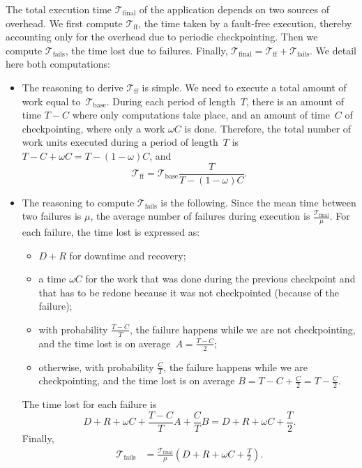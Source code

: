 \documentclass[a4paper]{article}
\newcommand{\ema}[1]{\ensuremath{#1}\xspace}
\newcommand{\ccc}{\ema{C}}
\newcommand{\rrr}{\ema{R}}
\newcommand{\ddd}{\ema{D}}
\newcommand{\period}{T}
\renewcommand{\time}[1][]{\ema{\mathcal{T}_{\text{#1}}}}
\newcommand{\tbase}{\time[base]}
\newcommand{\tff}{\time[ff]}
\newcommand{\tfails}{\time[fails]}
\newcommand{\tfin}{\time[final]}
\newcommand{\workduringckpt}{\omega}
\begin{document}
The total execution time \tfin of the application depends on two sources of overhead. We 
first compute \tff, the time taken by a fault-free execution, thereby accounting only 
for the overhead due to 
periodic checkpointing. Then we compute \tfails, the time lost due to failures. Finally,  
$\tfin=\tff+\tfails$. We detail here both computations:
\begin{itemize}
	\item The reasoning to derive \tff is simple. We need to execute a total amount of work equal to~\tbase.
	During each period of length~$\period$,
there is an amount of time $\period - \ccc$ where only computations take place, and an amount of time~$\ccc$ 
of checkpointing, where only a work $\workduringckpt \ccc$ is done. Therefore, the total number of work
units executed during a period of length~$\period$ is $\period - \ccc +\workduringckpt \ccc = \period - (1- \workduringckpt) \ccc$,
and \\[-.2cm]
\[\tff = \tbase \frac{\period}{\period - (1- \workduringckpt) \ccc}.\]
\item The reasoning to compute \tfails is the following. Since the mean time between two failures is $\mu$, 
	the average number of failures during execution is $\frac{\tfin}{\mu}$.
For each failure, the time lost is expressed as: 
	\begin{itemize}
		\item $\ddd + \rrr$ for downtime and recovery; 
	  	\item a time $\workduringckpt \ccc$ for the work that was done during the previous 
		checkpoint and that has to be redone because it was not checkpointed (because of the failure); 
		\item with probability $\frac{\period - \ccc}{\period}$, the failure happens while we 
	are not checkpointing, and the time lost is on average~$A = \frac{\period - \ccc}{2}$; 
		\item otherwise, with probability $\frac{\ccc}{\period}$, the failure happens while we are
	checkpointing, and the time lost is on average
	$B = \period-\ccc + \frac{\ccc}{2} = \period-\frac{\ccc}{2}$.
	\end{itemize}
	The time lost for each failure is 
	$$\ddd + \rrr +\workduringckpt\ccc + \frac{\period - \ccc}{\period} A + \frac{\ccc}{\period} B = \ddd + \rrr +\workduringckpt\ccc + \frac{\period}{2}.$$
	Finally, \\[-.7cm]
	\begin{align*}
	\tfails &= \frac{\tfin}{\mu} \left ( \ddd + \rrr +\workduringckpt\ccc + \frac{\period}{2} \right ) .
	\end{align*}
\end{itemize}
\end{document}
